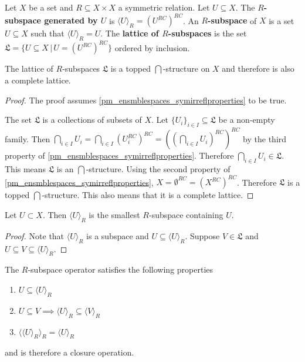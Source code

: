 \begin{defn}
	Let $X$ be a set and $R \subseteq X \times X$ a symmetric relation. Let $U \subseteq X$. The \textbf{$R$-subspace generated by $U$} is $\langle U \rangle_R = (U^{RC})^{RC}$. An \textbf{$R$-subspace} of $X$ is a set $U \subseteq X$ such that $\langle U \rangle_R = U$. The \textbf{lattice of $R$-subspaces} is the set $\mathfrak{L} = \{ U \subseteq X \, | \, U = (U^{RC})^{RC} \}$ ordered by inclusion.
\end{defn}

\begin{coro}
	The lattice of $R$-subspaces $\mathfrak{L}$ is a topped $\bigcap$-structure on $X$ and therefore is also a complete lattice.
\end{coro}
\begin{proof}
	The proof assumes \ref{pm_ensmblespaces_symirreflproperties} to be true.
	
	The set $\mathfrak{L}$ is a collections of subsets of $X$. Let $\{U_i\}_{i \in I} \subseteq \mathfrak{L}$ be a non-empty family. Then $\bigcap_{i \in I} U_i = \bigcap_{i \in I} (U_i^{RC})^{RC} = ((\bigcap_{i \in I} U_i)^{RC})^{RC}$ by the third property of \ref{pm_ensmblespaces_symirreflproperties}. Therefore $\bigcap_{i \in I} U_i \in \mathfrak{L}$. This means $\mathfrak{L}$ is an $\bigcap$-structure. Using the second property of \ref{pm_ensmblespaces_symirreflproperties}, $X = \emptyset^{RC} = (X^{RC})^{RC}$. Therefore $\mathfrak{L}$ is a topped $\bigcap$-structure. This also means that it is a complete lattice.
\end{proof}

\begin{coro}
	Let $U \subset X$. Then $\langle U \rangle_R$ is the smallest $R$-subspace containing $U$.
\end{coro}

\begin{proof}
	Note that $\langle U \rangle_R$ is a subspace and $U \subseteq \langle U \rangle_R$. Suppose $V \in \mathfrak{L}$ and $U \subseteq V \subseteq \langle U \rangle_R$. 
\end{proof}

\begin{coro}
	The $R$-subspace operator satisfies the following properties
	\begin{enumerate}
		\item $U \subseteq \langle U \rangle_R$
		\item $U \subseteq V \implies \langle U \rangle_R \subseteq \langle V \rangle_R$
		\item $\langle \langle U \rangle_R \rangle_R = \langle U \rangle_R $
	\end{enumerate}
	and is therefore a closure operation.
\end{coro}

